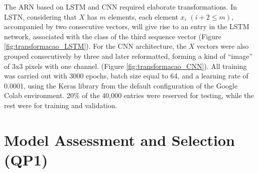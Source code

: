 \documentclass[a4paper,fleqn]{cas-sc}
\begin{document}
The ARN based on LSTM and CNN required elaborate transformations. In LSTN, considering that $X$ has $m$ elements, each element $x_i$ $(i+2\leq m)$, accompanied by two consecutive vectors, will give rise to an entry in the LSTM network, associated with the class of the third sequence vector (Figure \ref{fig:transformacao_LSTM}). For the CNN architecture, the $X$ vectors were also grouped consecutively by three and later reformatted, forming a kind of ``image'' of 3x3 pixels with one channel.  (Figure \ref{fig:transformacao_CNN}). All training was carried out with 3000 epochs, batch size equal to 64, and a learning rate of 0.0001, using the Keras library from the default configuration of the Google Colab environment. 20\% of the 40,000 entries were reserved for testing, while the rest were for training and validation.

\section{Model Assessment and Selection (QP1)} 
\end{document}
